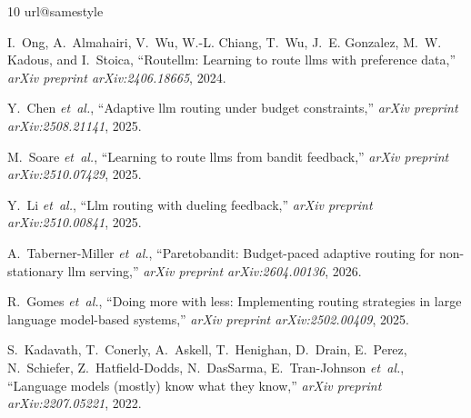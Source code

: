 \documentclass[journal]{IEEEtran}
\begin{document}

\begin{thebibliography}{10}
\providecommand{\url}[1]{#1}
\csname url@samestyle\endcsname
\providecommand{\newblock}{\relax}
\providecommand{\bibinfo}[2]{#2}
\providecommand{\BIBentrySTDinterwordspacing}{\spaceskip=0pt\relax}
\providecommand{\BIBentryALTinterwordstretchfactor}{4}
\providecommand{\BIBentryALTinterwordspacing}{\spaceskip=\fontdimen2\font plus
\BIBentryALTinterwordstretchfactor\fontdimen3\font minus
  \fontdimen4\font\relax}
\providecommand{\BIBforeignlanguage}[2]{{%
\expandafter\ifx\csname l@#1\endcsname\relax
\typeout{** WARNING: IEEEtran.bst: No hyphenation pattern has been}%
\typeout{** loaded for the language `#1'. Using the pattern for}%
\typeout{** the default language instead.}%
\else
\language=\csname l@#1\endcsname
\fi
#2}}
\providecommand{\BIBdecl}{\relax}
\BIBdecl

I.~Ong, A.~Almahairi, V.~Wu, W.-L. Chiang, T.~Wu, J.~E. Gonzalez, M.~W. Kadous,
  and I.~Stoica, ``Routellm: Learning to route llms with preference data,''
  \emph{arXiv preprint arXiv:2406.18665}, 2024.

Y.~Chen \emph{et~al.}, ``Adaptive llm routing under budget constraints,''
  \emph{arXiv preprint arXiv:2508.21141}, 2025.

M.~Soare \emph{et~al.}, ``Learning to route llms from bandit feedback,''
  \emph{arXiv preprint arXiv:2510.07429}, 2025.

Y.~Li \emph{et~al.}, ``Llm routing with dueling feedback,'' \emph{arXiv
  preprint arXiv:2510.00841}, 2025.

A.~Taberner-Miller \emph{et~al.}, ``Paretobandit: Budget-paced adaptive routing
  for non-stationary llm serving,'' \emph{arXiv preprint arXiv:2604.00136},
  2026.

R.~Gomes \emph{et~al.}, ``Doing more with less: Implementing routing strategies
  in large language model-based systems,'' \emph{arXiv preprint
  arXiv:2502.00409}, 2025.

S.~Kadavath, T.~Conerly, A.~Askell, T.~Henighan, D.~Drain, E.~Perez,
  N.~Schiefer, Z.~Hatfield-Dodds, N.~DasSarma, E.~Tran-Johnson \emph{et~al.},
  ``Language models (mostly) know what they know,'' \emph{arXiv preprint
  arXiv:2207.05221}, 2022.


\end{thebibliography}
\end{document}
